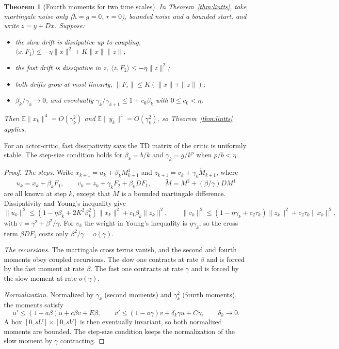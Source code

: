 \documentclass[11pt]{article}
\newtheorem{theorem}{Theorem}[section]
\theoremstyle{definition}
\theoremstyle{remark}
\newcommand{\E}{\mathbb{E}}
\begin{document}
\begin{theorem}[Fourth moments for two time scales]\label{thm:ttsmoments}
In Theorem~\ref{thm:lintts}, take martingale noise only ($h = g = 0$, $r = 0$), bounded noise and a
bounded start, and write $z = y + Dx$. Suppose:
\begin{itemize}
\item the slow drift is dissipative up to coupling, $\langle x, F_1\rangle \le -\eta\|x\|^2 + K\|x\|\|z\|$;
\item the fast drift is dissipative in $z$, $\langle z, F_2\rangle \le -\eta\|z\|^2$;
\item both drifts grow at most linearly, $\|F_i\| \le K(\|x\| + \|z\|)$;
\item $\beta_k/\gamma_k \to 0$, and eventually $\gamma_k/\gamma_{k+1} \le 1 + c_0\beta_k$ with $0 \le c_0 < \eta$.
\end{itemize}
Then $\E\|x_k\|^4 = O(\gamma_k^2)$ and $\E\|y_k\|^4 = O(\gamma_k^2)$, so Theorem~\ref{thm:lintts} applies.
\end{theorem}
For an actor-critic, fast dissipativity says the TD matrix of the critic is uniformly stable. The
step-size condition holds for $\beta_k = b/k$ and $\gamma_k = g/k^p$ when $p/b < \eta$.
\begin{proof}
\emph{The steps.} Write $x_{k+1} = u_k + \beta_kM^1_{k+1}$ and $z_{k+1} = v_k + \gamma_k\tilde M_{k+1}$, where
\[
  u_k = x_k + \beta_kF_1,\qquad v_k = z_k + \gamma_kF_2 + \beta_kDF_1,\qquad
  \tilde M = M^2 + (\beta/\gamma)DM^1
\]
are all known at step $k$, except that $\tilde M$ is a bounded martingale difference. Dissipativity and
Young's inequality give
\[
  \|u_k\|^2 \le (1 - \eta\beta_k + 2K^2\beta_k^2)\|x_k\|^2 + c_1\beta_k\|z_k\|^2,\qquad
  \|v_k\|^2 \le (1 - \eta\gamma_k + c_2\tau_k)\|z_k\|^2 + c_2\tau_k\|x_k\|^2,
\]
with $\tau = \gamma^2 + \beta^2/\gamma$. For $v_k$ the weight in Young's inequality is $\eta\gamma_k$, so the
cross term $\beta DF_1$ costs only $\beta^2/\gamma = o(\gamma)$.

\emph{The recursions.} The martingale cross terms vanish, and the second and fourth moments obey
coupled recursions. The slow one contracts at rate $\beta$ and is forced by the fast moment at rate
$\beta$. The fast one contracts at rate $\gamma$ and is forced by the slow moment at rate $o(\gamma)$.

\emph{Normalization.} Normalized by $\gamma_k$ (second moments) and $\gamma_k^2$ (fourth moments), the
moments satisfy
\[
  u' \le (1 - a\beta)u + c\beta v + E\beta,\qquad v' \le (1 - a\gamma)v + \delta_k\gamma u + C\gamma,\qquad \delta_k \to 0 .
\]
A box $[0, sU]\times[0, sV]$ is then eventually invariant, so both normalized moments are bounded. The
step-size condition keeps the normalization of the slow moment by $\gamma$ contracting.
\end{proof}
\end{document}

